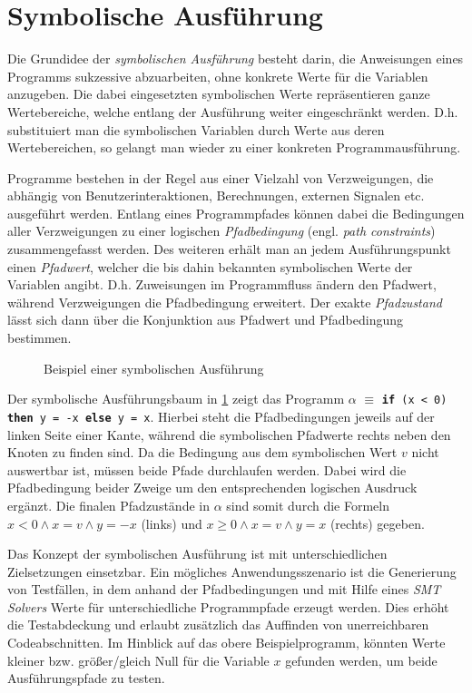 \section{Symbolische Ausführung}

Die Grundidee der \emph{symbolischen Ausführung} besteht darin, die Anweisungen eines Programms sukzessive abzuarbeiten, ohne konkrete Werte für die Variablen anzugeben. Die dabei eingesetzten symbolischen Werte repräsentieren ganze Wertebereiche, welche entlang der Ausführung weiter eingeschränkt werden. D.h. substituiert man die symbolischen Variablen durch Werte aus deren Wertebereichen, so gelangt man wieder zu einer konkreten Programmausführung.

Programme bestehen in der Regel aus einer Vielzahl von Verzweigungen, die abhängig von Benutzerinteraktionen, Berechnungen, externen Signalen etc. ausgeführt werden. Entlang eines Programmpfades können dabei die Bedingungen aller Verzweigungen zu einer logischen \emph{Pfadbedingung} (engl. \emph{path constraints}) zusammengefasst werden. Des weiteren erhält man an jedem Ausführungspunkt einen \emph{Pfadwert}, welcher die bis dahin bekannten symbolischen Werte der Variablen angibt. D.h. Zuweisungen im Programmfluss ändern den Pfadwert, während Verzweigungen die Pfadbedingung erweitert. Der exakte \emph{Pfadzustand} lässt sich dann über die Konjunktion aus Pfadwert und Pfadbedingung bestimmen. \cite{Kneuper2008}

\begin{figure}[!hbt]
	\centering
	
	\caption{Beispiel einer symbolischen Ausführung}
	\label{fig:tree}
\end{figure}

\noindent
Der symbolische Ausführungsbaum in \cref{fig:tree} zeigt das Programm $\alpha$ $\equiv$ \texttt{\textbf{if} (x < 0) \textbf{then} y = -x \textbf{else} y = x}. Hierbei steht die Pfadbedingungen jeweils auf der linken Seite einer Kante, während die symbolischen Pfadwerte rechts neben den Knoten zu finden sind. Da die Bedingung aus dem symbolischen Wert $v$ nicht auswertbar ist, müssen beide Pfade durchlaufen werden. Dabei wird die Pfadbedingung beider Zweige um den entsprechenden logischen Ausdruck ergänzt. Die finalen Pfadzustände in $\alpha$ sind somit durch die Formeln $x < 0 \wedge x = v \wedge y = -x$ (links) und $x \geq 0 \wedge x = v \wedge y = x$ (rechts) gegeben.

Das Konzept der symbolischen Ausführung ist mit unterschiedlichen Zielsetzungen einsetzbar. Ein mögliches Anwendungsszenario ist die Generierung von Testfällen, in dem anhand der Pfadbedingungen und mit Hilfe eines \emph{SMT Solvers} Werte für unterschiedliche Programmpfade erzeugt werden. Dies erhöht die Testabdeckung und erlaubt zusätzlich das Auffinden von unerreichbaren Codeabschnitten. Im Hinblick auf das obere Beispielprogramm, könnten Werte kleiner bzw. größer/gleich Null für die Variable $x$ gefunden werden, um beide Ausführungspfade zu testen.

